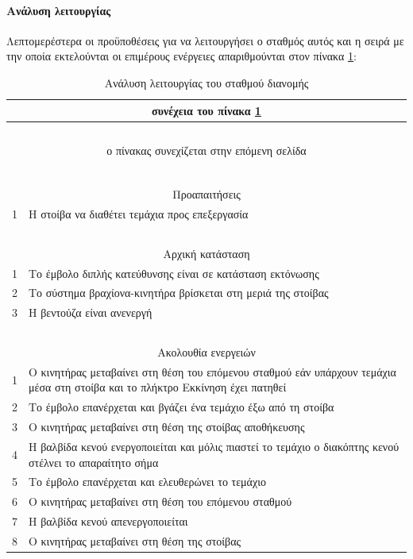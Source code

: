 \documentclass[a4paper,12pt,twoside]{report}
\begin{document}
				\paragraph{Ανάλυση λειτουργίας} {Λεπτομερέστερα οι προϋποθέσεις για να λειτουργήσει ο σταθμός αυτός και η σειρά με την οποία εκτελούνται οι επιμέρους ενέργειες απαριθμούνται στον πίνακα \ref{πιν.:Ανάλυση λειτουργίας του σταθμού διανομής}:
				}
				\begin{longtable} { m{0.5cm} m{12cm} }
					\caption [Ανάλυση λειτουργίας του σταθμού διανομής]  {Ανάλυση λειτουργίας του σταθμού διανομής \cite{FestoMPSDistributionStationManual}}
					\label{πιν.:Ανάλυση λειτουργίας του σταθμού διανομής}\\
					\hline
					\endfirsthead
					\multicolumn{2}{c}{συνέχεια του πίνακα \ref{πιν.:Ανάλυση λειτουργίας του σταθμού διανομής}}\\
					\hline
					~\\
					\endhead
					\hline
					\multicolumn{2}{c}{ο πίνακας συνεχίζεται στην επόμενη σελίδα}\\
					\endfoot
					\multicolumn{2}{c}{ολοκληρώθηκε ο πίνακας \ref{πιν.:Ανάλυση λειτουργίας του σταθμού διανομής}}\\
					\endlastfoot
					~\\
					\multicolumn{2}{c}{Προαπαιτήσεις}\\
					1 & Η στοίβα να διαθέτει τεμάχια προς επεξεργασία\\
					\hline
					~\\
					\multicolumn{2}{c}{Αρχική κατάσταση}\\
					1 & Το έμβολο διπλής κατεύθυνσης είναι σε κατάσταση εκτόνωσης\\
					2 & Το σύστημα βραχίονα-κινητήρα βρίσκεται στη μεριά της στοίβας\\
					3 & Η βεντούζα είναι ανενεργή\\
					\hline
					~\\
					\multicolumn{2}{c}{Ακολουθία ενεργειών}\\
					1 & Ο κινητήρας μεταβαίνει στη θέση του επόμενου σταθμού εάν υπάρχουν τεμάχια μέσα στη στοίβα και το πλήκτρο Εκκίνηση έχει πατηθεί\\
					2 & Το έμβολο επανέρχεται και βγάζει ένα τεμάχιο έξω από τη στοίβα\\
					3 & Ο κινητήρας μεταβαίνει στη θέση της στοίβας αποθήκευσης\\
					4 & Η βαλβίδα κενού ενεργοποιείται και μόλις πιαστεί το τεμάχιο ο διακόπτης κενού στέλνει το απαραίτητο σήμα\\
					5 & Το έμβολο επανέρχεται και ελευθερώνει το τεμάχιο\\
					6 & Ο κινητήρας μεταβαίνει στη θέση του επόμενου σταθμού\\
					7 & Η βαλβίδα κενού απενεργοποιείται\\
					8 & Ο κινητήρας μεταβαίνει στη θέση της στοίβας\\
					\hline
				\end{longtable}
			
\end{document}
